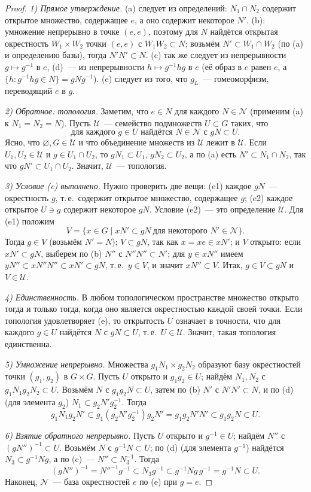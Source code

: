 \begin{proof}
\emph{1) Прямое утверждение.} (a) следует из определений: $N_1\cap N_2$ содержит открытое множество, содержащее $e$, а
оно содержит некоторое $N'$. (b): умножение непрерывно в точке $(e,e)$, поэтому для $N$ найдётся открытая окрестность
$W_1\times W_2$ точки $(e,e)$ с $W_1W_2\subset N$; возьмём $N'\subset W_1\cap W_2$ (по (a) и определению базы), тогда
$N'N'\subset N$. (c) так же следует из непрерывности $g\mapsto g^{-1}$ в $e$, (d)~--- из непрерывности
$h\mapsto g^{-1}hg$ в $e$ (её образ в $e$ равен $e$, а $\{h: g^{-1}hg\in N\}=gNg^{-1}$). (e) следует из того, что $g_L$~---
гомеоморфизм, переводящий $e$ в $g$.

\emph{2) Обратное: топология.} Заметим, что $e\in N$ для каждого $N\in\mathcal N$ (применим (a) к $N_1=N_2=N$).
Пусть $\mathcal U$~--- семейство подмножеств $U\subset G$ таких, что
\[
\text{для каждого }g\in U\text{ найдётся }N\in\mathcal N\text{ с }gN\subset U.
\]
Ясно, что $\varnothing,G\in\mathcal U$ и что объединение множеств из $\mathcal U$ лежит в $\mathcal U$. Если
$U_1,U_2\in\mathcal U$ и $g\in U_1\cap U_2$, то $gN_1\subset U_1$, $gN_2\subset U_2$, а по (a) есть $N'\subset N_1\cap N_2$,
так что $gN'\subset U_1\cap U_2$. Значит, $\mathcal U$~--- топология.

\emph{3) Условие (e) выполнено.} Нужно проверить две вещи: (e1) каждое $gN$~--- окрестность $g$, т.\,е.\ содержит
открытое множество, содержащее $g$; (e2) каждое открытое $U\ni g$ содержит некоторое $gN$. Условие (e2)~--- это
определение $\mathcal U$. Для (e1) положим
\[
V=\{x\in G\mid xN'\subset gN\ \text{для некоторого }N'\in\mathcal N\}.
\]
Тогда $g\in V$ (возьмём $N'=N$); $V\subset gN$, так как $x=xe\in xN'$; и $V$ открыто: если $xN'\subset gN$, выберем по (b)
$N''$ с $N''N''\subset N'$; для $y\in xN''$ имеем $yN''\subset xN''N''\subset xN'\subset gN$, т.\,е.\ $y\in V$, и
значит $xN''\subset V$. Итак, $g\in V\subset gN$ и $V\in\mathcal U$.

\emph{4) Единственность.} В любом топологическом пространстве множество открыто тогда и только тогда, когда оно
является окрестностью каждой своей точки. Если топология удовлетворяет (e), то открытость $U$ означает в точности, что
для каждого $g\in U$ найдётся $N$ с $gN\subset U$, т.\,е.\ $U\in\mathcal U$. Значит, такая топология единственна.

\emph{5) Умножение непрерывно.} Множества $g_1N_1\times g_2N_2$ образуют базу окрестностей точки $(g_1,g_2)$ в
$G\times G$. Пусть $U$ открыто и $g_1g_2\in U$; найдём $N_1,N_2$ с $g_1N_1g_2N_2\subset U$. Возьмём $N$ с
$g_1g_2N\subset U$, затем по (b) $N'$ с $N'N'\subset N$, и по (d) (для элемента $g_2$) $N_1\subset g_2N'g_2^{-1}$. Тогда
\[
g_1N_1g_2N'\subset g_1(g_2N'g_2^{-1})g_2N'=g_1g_2N'N'\subset g_1g_2N\subset U .
\]

\emph{6) Взятие обратного непрерывно.} Пусть $U$ открыто и $g^{-1}\in U$; найдём $N''$ с $(gN'')^{-1}\subset U$. Возьмём
$N$ с $g^{-1}N\subset U$; по (d) (для элемента $g^{-1}$) найдётся $N_3\subset g^{-1}Ng$, а по (c)~--- $N''\subset N_3^{-1}$.
Тогда
\[
(gN'')^{-1}=N''^{-1}g^{-1}\subset N_3g^{-1}\subset g^{-1}Ng\,g^{-1}=g^{-1}N\subset U.
\]
Наконец, $\mathcal N$~--- база окрестностей $e$ по (e) при $g=e$.
\end{proof}

